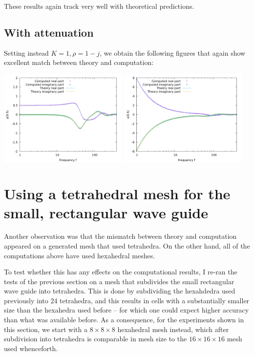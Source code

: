 \documentclass{article}
\begin{document}
These results again track very well with theoretical predictions.

\subsection{With attenuation}

Setting instead $K=1,\rho=1-j$, we obtain the following figures that
again show excellent match between theory and computation:

\begin{center}
\includegraphics[width=0.48\textwidth]{wave-guide/with-attenuation/pressure-at-center.png}
\includegraphics[width=0.48\textwidth]{wave-guide/with-attenuation/velocity-at-center.png}
\end{center}



\section{Using a tetrahedral mesh for the small, rectangular wave guide}

Another observation was that the mismatch between theory and
computation appeared on a generated mesh that used tetrahedra. On the
other hand, all of the computations above have used hexahedral meshes.

To test whether this has any effects on the computational results, I
re-ran the tests of the previous section on a mesh that subdivides the
small rectangular wave guide into tetrahedra. This is done by
subdividing the hexahdedra used previously into 24
tetrahedra, and this results in cells with a substantially smaller
size than the hexahedra used before -- for which one could expect
higher accuracy than what was available before. As a consequence, for
the experiments shown in this section, we start with a $8\times
8\times 8$ hexahedral mesh instead, which after subdivision into
tetrahedra is comparable in mesh size to the  $16\times 16\times 16$
mesh used whenceforth.
\end{document}
